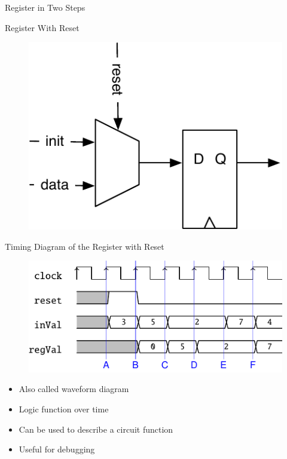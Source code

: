 \begin{frame}[fragile]{Register in Two Steps}
\end{frame}

\begin{frame}[fragile]{Register With Reset}
\begin{figure}
  \includegraphics[scale=\scale]{../figures/register-reset}
\end{figure}
\end{frame}

\begin{frame}[fragile]{Timing Diagram of the Register with Reset}
\begin{figure}
  \includegraphics[scale=1]{../figures/reg_wave}
\end{figure}
\begin{itemize}
\item Also called waveform diagram
\item Logic function over time
\item Can be used to describe a circuit function
\item Useful for debugging
\end{itemize}
\end{frame}

